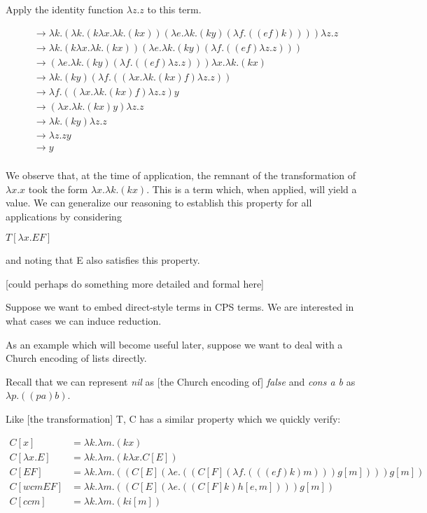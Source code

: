 \documentclass[ms,electronic,twosidetoc,letterpaper,chaptercenter,parttop]{byumsphd}
\begin{document}
Apply the identity function $\lambda z.z$ to this term.

\begin{align*}
&\rightarrow \lambda k.(\lambda k.(k \lambda x.\lambda k.(k x)) (\lambda e.\lambda k.(k y) (\lambda f.((e f) k)))) \lambda z.z\\
&\rightarrow \lambda k.(k \lambda x.\lambda k.(k x)) (\lambda e.\lambda k.(k y) (\lambda f.((e f) \lambda z.z)))\\
&\rightarrow (\lambda e.\lambda k.(k y) (\lambda f.((e f) \lambda z.z))) \lambda x.\lambda k.(k x)\\
&\rightarrow \lambda k.(k y) (\lambda f.((\lambda x.\lambda k.(k x) f) \lambda z.z))\\
&\rightarrow \lambda f.((\lambda x.\lambda k.(k x) f) \lambda z.z) y\\
&\rightarrow (\lambda x.\lambda k.(k x) y) \lambda z.z\\
&\rightarrow \lambda k.(k y) \lambda z.z\\
&\rightarrow \lambda z.z y\\
&\rightarrow y\\
\end{align*}

We observe that, at the time of application, the remnant of the transformation of $\lambda x.x$ took the form 
$\lambda x.\lambda k.(k x)$. This is a term which, when applied, will yield a value. We can generalize our reasoning 
to establish this property for all applications by considering

$T[\lambda x.E F]$

and noting that E also satisfies this property.

[could perhaps do something more detailed and formal here]

Suppose we want to embed direct-style terms in CPS terms. We are interested in what cases we can induce 
reduction.

As an example which will become useful later, suppose we want to deal with a Church encoding of lists 
directly.

Recall that we can represent \emph{nil} as [the Church encoding of] \emph{false} and \emph{cons a b} as 
$\lambda p.((p a) b)$.

Like [the transformation] T, C has a similar property which we quickly verify:

\begin{align*}
C[x]           &= \lambda k.\lambda m.(k x)\\
C[\lambda x.E] &= \lambda k.\lambda m.(k \lambda x.C[E])\\
C[E F]         &= \lambda k.\lambda m.((C[E] (\lambda e.((C[F] (\lambda f.(((e f) k) m))) g[m]))) g[m])\\
C[wcm E F]     &= \lambda k.\lambda m.((C[E] (\lambda e.((C[F] k) h[e,m]))) g[m])\\
C[ccm]         &= \lambda k.\lambda m.(k i[m])\\
\end{align*}
\end{document}
